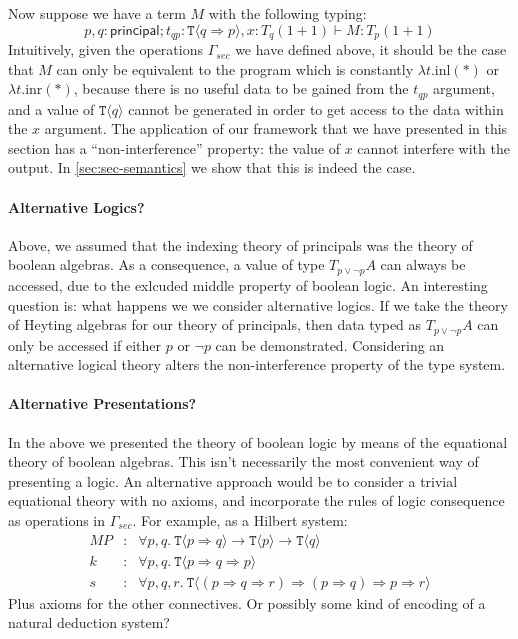 \documentclass[natbib,preprint]{sigplanconf}
\newcommand{\tyPrim}[2]{\texttt{#1}\langle #2 \rangle}
\begin{document}
Now suppose we have a term $M$ with the following typing:
\begin{displaymath}
  p,q:\mathsf{principal}; t_{qp} : \tyPrim{T}{q \Rightarrow p}, x : T_q (1 + 1) \vdash M : T_p (1 + 1)
\end{displaymath}
Intuitively, given the operations $\Gamma_{\mathit{sec}}$ we have
defined above, it should be the case that $M$ can only be equivalent
to the program which is constantly $\lambda t. \mathrm{inl}(*)$ or
$\lambda t. \mathrm{inr}(*)$, because there is no useful data to be
gained from the $t_{qp}$ argument, and a value of $\tyPrim{T}{q}$
cannot be generated in order to get access to the data within the $x$
argument. The application of our framework that we have presented in
this section has a ``non-interference'' property: the value of $x$
cannot interfere with the output. In \autoref{sec:sec-semantics} we
show that this is indeed the case.

\paragraph{Alternative Logics?}
Above, we assumed that the indexing theory of principals was the
theory of boolean algebras. As a consequence, a value of type $T_{p
  \lor \lnot p}A$ can always be accessed, due to the exlcuded middle
property of boolean logic. An interesting question is: what happens we
we consider alternative logics. If we take the theory of Heyting
algebras for our theory of principals, then data typed as $T_{p \lor
  \lnot p}A$ can only be accessed if either $p$ or $\lnot p$ can be
demonstrated. Considering an alternative logical theory alters the
non-interference property of the type system.

\paragraph{Alternative Presentations?}
In the above we presented the theory of boolean logic by means of the
equational theory of boolean algebras. This isn't necessarily the most
convenient way of presenting a logic. An alternative approach would be
to consider a trivial equational theory with no axioms, and
incorporate the rules of logic consequence as operations in
$\Gamma_{\mathit{sec}}$. For example, as a Hilbert system:
\begin{eqnarray*}
  \mathit{MP} & : & \forall p,q.\ \tyPrim{T}{p \Rightarrow q} \to \tyPrim{T}{p} \to \tyPrim{T}{q} \\
  \mathit{k} & : & \forall p,q.\ \tyPrim{T}{p \Rightarrow q \Rightarrow p} \\
  \mathit{s} & : & \forall p,q,r.\ \tyPrim{T}{(p \Rightarrow q \Rightarrow r) \Rightarrow (p \Rightarrow q) \Rightarrow p \Rightarrow r}
\end{eqnarray*}
Plus axioms for the other connectives.  Or possibly some kind of
encoding of a natural deduction system?
\end{document}
